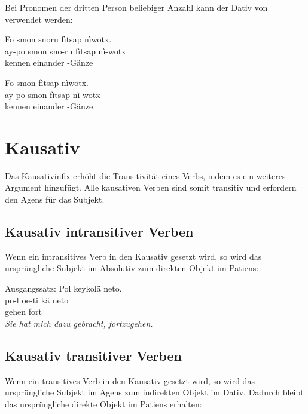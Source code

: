 \noindent Bei Pronomen der dritten Person beliebiger Anzahl kann der Dativ von  verwendet werden:

\begin{interlin}
	\glll \Npawl{}Fo smon snoru fìtsap nìwotx. \\
	ay-po smon sno-ru fìtsap nì-wotx \\
	 kennen  einander -Gänze \\
\end{interlin}

\begin{interlin}
	\glll \Npawl{}Fo smon  fìtsap nìwotx. \\
	ay-po smon fìtsap nì-wotx \\
	 kennen einander -Gänze \\
\end{interlin}
\noindent {}

\section{Kausativ}
\noindent Das Kausativinfix  erhöht die Transitivität eines Verbs, indem es ein weiteres Argument hinzufügt. Alle kausativen Verben sind somit transitiv und erfordern den Agens für das Subjekt.
\label{syn:causative}

\subsection{Kausativ intransitiver Verben} Wenn ein intransitives Verb in den Kausativ gesetzt wird, so wird das ursprüngliche Subjekt im Absolutiv zum direkten Objekt im Patiens:

\begin{interlin}
	Ausgangssatz:   
	\glll Pol  keykolä neto. \\
	po-l oe-ti kä neto \\
	  gehen fort \\
	\vskip-4pt\textit{Sie hat mich dazu gebracht, fortzugehen.}
\end{interlin}

\subsection{Kausativ transitiver Verben} Wenn ein transitives Verb in den Kausativ gesetzt wird, so wird das ursprüngliche Subjekt im Agens zum indirekten Objekt im Dativ. Dadurch bleibt das ursprüngliche direkte Objekt im Patiens erhalten:  \label{syn:trans-causative}

